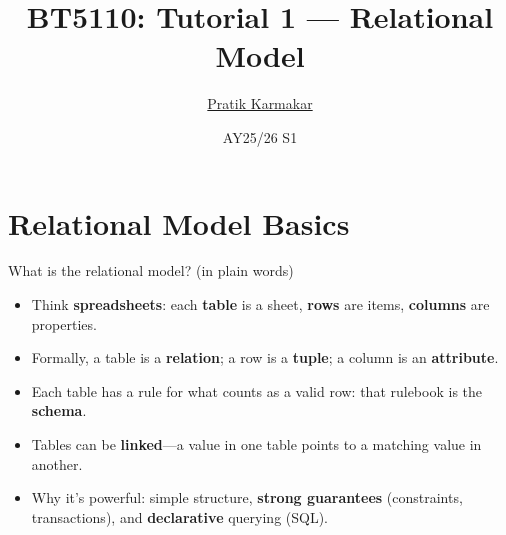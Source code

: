 \documentclass{beamer}
\title{BT5110: Tutorial 1 — Relational Model}
\author{\href{https://pratik2358.github.io/}{Pratik Karmakar}}
\institute{School of Computing,\\ National University of Singapore}
\date{AY25/26 S1}
\begin{document}
\begin{frame}
  \titlepage
\end{frame}

\section{Relational Model Basics}

\begin{frame}{What is the relational model? (in plain words)}
\begin{itemize}
  \item Think \textbf{spreadsheets}: each \textbf{table} is a sheet, \textbf{rows} are items, \textbf{columns} are properties.
  \item Formally, a table is a \textbf{relation}; a row is a \textbf{tuple}; a column is an \textbf{attribute}.
  \item Each table has a rule for what counts as a valid row: that rulebook is the \textbf{schema}.
  \item Tables can be \textbf{linked}—a value in one table points to a matching value in another.
  \item Why it’s powerful: simple structure, \textbf{strong guarantees} (constraints, transactions), and \textbf{declarative} querying (SQL).
\end{itemize}
\end{frame}
\end{document}
